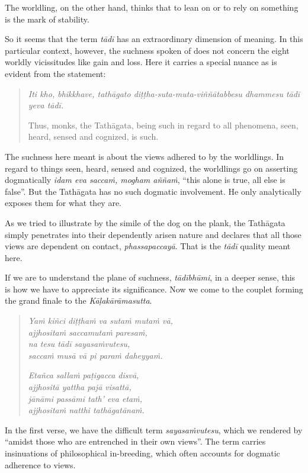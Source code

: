 The worldling, on the other hand, thinks that to lean on or to rely on something is the mark of stability.

So it seems that the term \emph{tādī} has an extraordinary dimension of meaning. In this particular context, however, the suchness spoken of does not concern the eight worldly vicissitudes like gain and loss. Here it carries a special nuance as is evident from the statement:

\begin{quote}
\emph{Iti kho, bhikkhave, tathāgato diṭṭha-suta-muta-viññātabbesu dhammesu tādī yeva tādī.}

Thus, monks, the Tathāgata, being such in regard to all phenomena, seen, heard, sensed and cognized, is such.
\end{quote}

The suchness here meant is about the views adhered to by the worldlings. In regard to things seen, heard, sensed and cognized, the worldlings go on asserting dogmatically \emph{idam eva saccaṁ, mogham aññaṁ}, ``this alone is true, all else is false''. But the Tathāgata has no such dogmatic involvement. He only analytically exposes them for what they are.

As we tried to illustrate by the simile of the dog on the plank, the Tathāgata simply penetrates into their dependently arisen nature and declares that all those views are dependent on contact, \emph{phassapaccayā}. That is the \emph{tādī} quality meant here.

If we are to understand the plane of suchness, \emph{tādībhūmi}, in a deeper sense, this is how we have to appreciate its significance. Now we come to the couplet forming the grand finale to the \emph{Kāḷakārāmasutta}.

\begin{quote}
\emph{Yaṁ kiñci diṭṭhaṁ va sutaṁ mutaṁ vā,}\\
\emph{ajjhositaṁ saccamutaṁ paresaṁ,}\\
\emph{na tesu tādī sayasaṁvutesu,}\\
\emph{saccaṁ musā vā pi paraṁ daheyyaṁ.}

\emph{Etañca sallaṁ paṭigacca disvā,}\\
\emph{ajjhositā yattha pajā visattā,}\\
\emph{jānāmi passāmi tath' eva etaṁ,}\\
\emph{ajjhositaṁ natthi tathāgatānaṁ.}
\end{quote}

In the first verse, we have the difficult term \emph{sayasaṁvutesu}, which we rendered by ``amidst those who are entrenched in their own views''. The term carries insinuations of philosophical in-breeding, which often accounts for dogmatic adherence to views.

